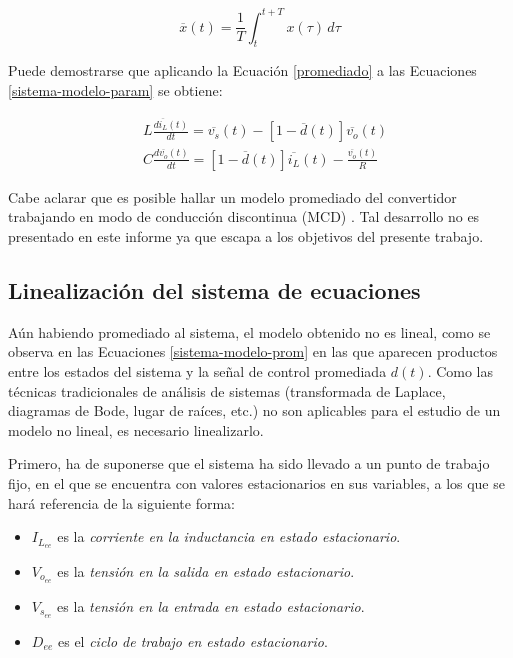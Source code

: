 \begin{equation}
  \overline{x}(t) = \frac{1}{T} \int_t^{t+T} x(\tau) \, d\tau
  \label{promediado}
\end{equation}

Puede demostrarse que aplicando la Ecuación \ref{promediado} a las Ecuaciones \ref{sistema-modelo-param} se obtiene:

\begin{equation}
  \boxed{
  \begin{split}
    & L \frac{d \overline{i_L}(t)}{dt} = \overline{v_s}(t) - \left[1-\overline{d}(t)\right] \overline{v_o}(t) 
    \\
    & C \frac{d \overline{v_o}(t)}{dt} = \left[1-\overline{d}(t)\right] \overline{i_L}(t) - \frac{\overline{v_o}(t)}{R}
  \end{split}
  }
  \label{sistema-modelo-prom}
\end{equation}

Cabe aclarar que es posible hallar un modelo promediado del convertidor trabajando en modo de conducción discontinua (MCD) \cite{jiansun}. Tal desarrollo no es presentado en este informe ya que escapa a los objetivos del presente trabajo.

\subsection{Linealización del sistema de ecuaciones}

Aún habiendo promediado al sistema, el modelo obtenido no es lineal, como se observa en las Ecuaciones \ref{sistema-modelo-prom} en las que aparecen productos entre los estados del sistema y la señal de control promediada $d(t)$. Como las técnicas tradicionales de análisis de sistemas (transformada de Laplace, diagramas de Bode, lugar de raíces, etc.) no son aplicables para el estudio de un modelo no lineal, es necesario linealizarlo.

Primero, ha de suponerse que el sistema ha sido llevado a un punto de trabajo fijo, en el que se encuentra con valores estacionarios en sus variables, a los que se hará referencia de la siguiente forma:

\begin{itemize}
  \item $I_{L_{ee}}$ es la \emph{corriente en la inductancia en estado estacionario}.
  \item $V_{o_{ee}}$ es la \emph{tensión en la salida en estado estacionario}.
  \item $V_{s_{ee}}$ es la \emph{tensión en la entrada en estado estacionario}.
  \item $D_{ee}$ es el \emph{ciclo de trabajo en estado estacionario}.
\end{itemize}

